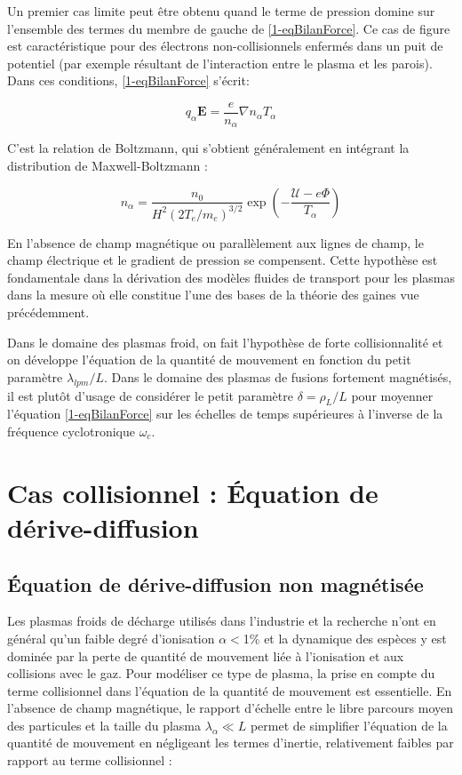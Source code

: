 \begin{refsection}
Un premier cas limite peut être obtenu quand le terme de pression domine
sur l'ensemble des termes du membre de gauche de \eqref{1-eqBilanForce}. Ce cas
de figure est caractéristique pour des électrons non-collisionnels enfermés
dans un puit de potentiel (par exemple résultant de l'interaction entre le
plasma et les parois). Dans ces conditions, \eqref{1-eqBilanForce} s'écrit:

\begin{equation}
\label{1-equilibreBoltzman}
q_\alpha\mathbf
E =\frac{e}{n_\alpha}\nabla n_\alpha T_\alpha
\end{equation}

C'est la relation de Boltzmann, qui s'obtient généralement en intégrant la
distribution de Maxwell-Boltzmann :

\begin{equation}
\label{1-profilBoltzman}
n_\alpha=\frac{n_0}{H^2\left(2T_e/m_e\right)^{3/2}}\exp(-\frac{\mathcal
U - e\Phi}{T_\alpha})
\end{equation}

En l'absence de champ magnétique ou parallèlement aux lignes de champ, le champ
électrique et le gradient de pression se compensent. Cette hypothèse est
fondamentale dans la dérivation des modèles fluides de transport pour les plasmas dans la mesure où elle constitue l'une des bases de
la théorie des gaines vue précédemment. 

Dans le domaine des plasmas
froid, on fait l'hypothèse de forte collisionnalité et on développe
l'équation de la quantité de mouvement en fonction du petit paramètre
$\lambda_{lpm}/L$.
Dans le domaine des plasmas de fusions fortement magnétisés, il est
plutôt d'usage de considérer le petit paramètre $\delta=\rho_L/L$ pour moyenner
l'équation \eqref{1-eqBilanForce} sur les échelles de temps supérieures à
l'inverse de la fréquence cyclotronique $\omega_{c}$.


\section{Cas collisionnel : Équation de dérive-diffusion}
\label{1-transportAmbipolaire}
\subsection{Équation de dérive-diffusion non magnétisée}
Les plasmas froids de décharge utilisés dans l'industrie et la recherche n'ont
en général qu'un faible degré d'ionisation $\alpha<$1\% et la dynamique des
espèces y est dominée par la perte de quantité de mouvement liée à l'ionisation
et aux collisions avec le gaz. Pour modéliser ce type de plasma, la prise en
compte du terme collisionnel dans l'équation de la quantité de mouvement est
essentielle.
En l'absence de champ magnétique, le rapport d'échelle entre le libre parcours moyen des particules
et la taille du plasma $\lambda_\alpha\ll L$ permet de simplifier l'équation de
la quantité de mouvement en négligeant les termes d'inertie, relativement
faibles par rapport au terme collisionnel :


\end{refsection}
